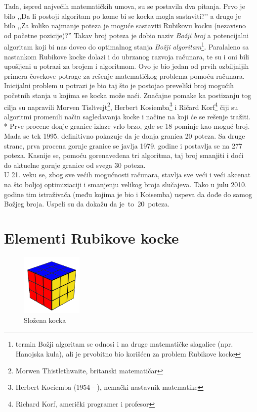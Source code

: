\documentclass[a4paper]{article}
\begin{document}
Tada, ispred najvećih matematičkih umova, su se postavila dva pitanja. Prvo je bilo ,,Da li postoji algoritam po kome bi se kocka mogla sastaviti?'' a drugo je bilo ,,Za koliko najmanje poteza je moguće sastaviti Rubikovu kocku (nezavisno od početne pozicije)?'' Takav broj poteza je dobio naziv \textit{Božji broj} a potencijalni algoritam koji bi nas doveo do optimalnog stanja \textit{Božji algoritam}\footnote{termin Božji algoritam se odnosi i na druge matematičke slagalice (npr. Hanojska kula), ali je prvobitno bio korišćen za problem Rubikove kocke}. Paralaleno sa nastankom Rubikove kocke dolazi i do ubrzanog razvoja računara, te su i oni bili upošljeni u potrazi za brojem i algoritmom. Ovo je bio jedan od prvih ozbiljnijih primera čovekove potrage za rešenje matematičkog problema pomoću računara. \\

Inicijalni problem u potrazi je bio taj što je postojao preveliki broj mogućih početnih stanja u kojima se kocka može naći. Značajne pomake ka postizanju tog cilja su napravili Morven Tisltvejt\footnote{{Morwen Thistlethwaite}, britanski matematičar}, Herbert Kosiemba\footnote{{Herbert Kociemba} (1954 - ), nemački nastavnik matematike} i Ričard Korf\footnote{{Richard Korf}, američki programer i profesor} čiji su algoritmi promenili način sagledavanja kocke i načine na koji će se rešenje tražiti.\\*
Prve procene donje granice izlaze vrlo brzo, gde se 18 pominje kao moguć broj. Mada se tek 1995. definitivno pokazuje da je donja granica 20 poteza. Sa druge strane, prva procena gornje granice se javlja 1979. godine i postavlja se na 277 poteza. Kasnije se, pomoću gorenavedena tri algoritma, taj broj smanjiti i doći do aktuelne gornje granice od svega 30 poteza.  \\

U 21. veku se, zbog sve većih mogućnosti računara, stavlja sve veći i veći akcenat na što boljoj optimiziaciji i smanjenju velikog broja slučajeva. Tako u julu 2010. godine tim istraživača (među kojima je bio i Koisemba) uspeva da dođe do samog Božjeg broja. Uspeli su da dokažu da je to 20 poteza.

\section{Elementi Rubikove kocke}
\label{sec:elementi}


 \begin{figure}[h!]
        \centering\includegraphics[height=3cm]{images/slozena-kocka.png} 
        \caption{Složena kocka}
        \label{fig:slozenakocka}
\end{figure}
\end{document}
